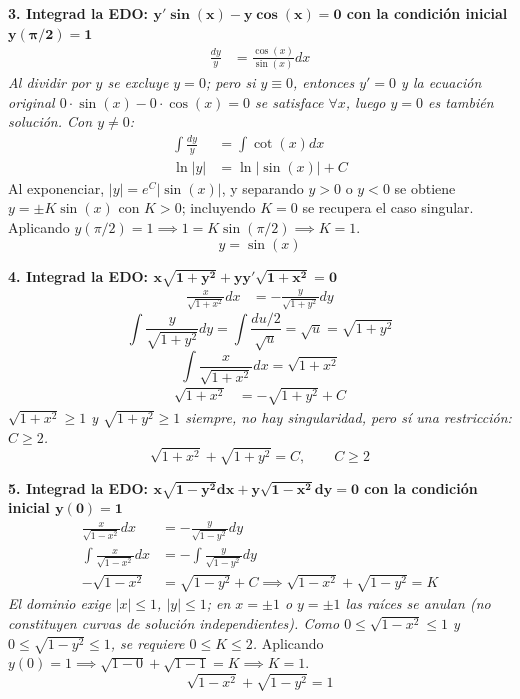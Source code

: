 \documentclass[11pt, a4paper]{article}
\begin{document}
\noindent\textbf{3. Integrad la EDO: $\bm{y'\sin(x)-y\cos(x)=0}$ con la condición inicial $\bm{y(\pi/2)=1}$} \\
\begin{align*}
\frac{dy}{y} &= \frac{\cos(x)}{\sin(x)}dx
\end{align*}
\textit{Al dividir por $y$ se excluye $y=0$; pero si $y\equiv 0$, entonces $y'=0$ y la ecuación original $0\cdot\sin(x)-0\cdot\cos(x)=0$ se satisface $\forall x$, luego $y=0$ es también solución. Con $y\neq0$:}
\begin{align*}
\int \frac{dy}{y} &= \int \cot(x)dx \\
\ln|y| &= \ln|\sin(x)| + C
\end{align*}
Al exponenciar, $|y|=e^C|\sin(x)|$, y separando $y>0$ o $y<0$ se obtiene $y=\pm K\sin(x)$ con $K>0$; incluyendo $K=0$ se recupera el caso singular.
Aplicando $y(\pi/2)=1 \implies 1 = K\sin(\pi/2) \implies K = 1$.
\[
\boxed{y = \sin(x)}
\]


\noindent\textbf{4. Integrad la EDO: $\bm{x\sqrt{1+y^2}+yy'\sqrt{1+x^2}=0}$} \\
\begin{align*}
\frac{x}{\sqrt{1+x^2}}dx &= -\frac{y}{\sqrt{1+y^2}}dy
\end{align*}
\[
\int \frac{y}{\sqrt{1+y^2}}dy = \int \frac{du/2}{\sqrt{u}} = \sqrt{u} = \sqrt{1+y^2}
\]
\[
\int \frac{x}{\sqrt{1+x^2}}dx=\sqrt{1+x^2}
\]
\begin{align*}
\sqrt{1+x^2} &= -\sqrt{1+y^2} + C
\end{align*}
\textit{$\sqrt{1+x^2}\geq1$ y $\sqrt{1+y^2}\geq1$ siempre, no hay singularidad, pero sí una restricción: $C\geq2$.}
\[
\boxed{\sqrt{1+x^2} + \sqrt{1+y^2} = C, \qquad C\geq 2}
\]


\noindent\textbf{5. Integrad la EDO: $\bm{x\sqrt{1-y^2}dx+y\sqrt{1-x^2}dy=0}$ con la condición inicial $\bm{y(0)=1}$} \\
\begin{align*}
\frac{x}{\sqrt{1-x^2}}dx &= -\frac{y}{\sqrt{1-y^2}}dy \\
\int \frac{x}{\sqrt{1-x^2}}dx &= -\int \frac{y}{\sqrt{1-y^2}}dy \\
-\sqrt{1-x^2} &= \sqrt{1-y^2} + C \implies \sqrt{1-x^2} + \sqrt{1-y^2} = K
\end{align*}
\textit{El dominio exige $|x|\leq1$, $|y|\leq1$; en $x=\pm1$ o $y=\pm1$ las raíces se anulan (no constituyen curvas de solución independientes). Como $0\leq\sqrt{1-x^2}\leq1$ y $0\leq\sqrt{1-y^2}\leq1$, se requiere $0\leq K\leq2$.}
Aplicando $y(0)=1 \implies \sqrt{1-0} + \sqrt{1-1} = K \implies K=1$.
\[
\boxed{\sqrt{1-x^2} + \sqrt{1-y^2} = 1}
\]
\end{document}
